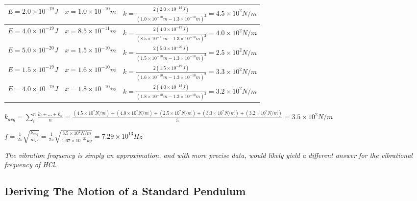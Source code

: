 \documentclass{article}
\begin{document}
\begin{center}
\begin{tabularx}{1\textwidth} { 
		| >{\raggedright\arraybackslash}X 
		| >{\centering\arraybackslash}X 
		| >{\raggedleft\arraybackslash}X | }
	\hline
	$E=2.0\times10^{-19}J$ & $x=1.0\times10^{-10}m$ & $k = \frac{2(2.0\times10^{-19}J)}{(1.0\times10^{-10}m - 1.3\times10^{-10}m)^2}=4.5\times10^{2}N/m $ \\
	\hline
	$E = 4.0\times10^{-19}J$  & $x = 8.5\times10^{-11}m $  & $k = \frac{2(4.0\times10^{-19}J)}{(8.5\times10^{-11}m - 1.3\times10^{-10}m)^2}=4.0\times10^{2}N/m $\\
	\hline
	$E = 5.0\times10^{-20}J$ & $x = 1.5\times10^{-10}m$ & $k = \frac{2(5.0\times10^{-20}J)}{(1.5\times10^{-10}m - 1.3\times10^{-10}m)^2}=2.5\times10^{2}N/m $ \\
	\hline
	$E = 1.5\times10^{-19}J$ & $x=1.6\times10^{-10}m$  & $k = \frac{2(1.5\times10^{-19}J)}{(1.6\times10^{-10}m - 1.3\times10^{-10}m)^2}=3.3\times10^{2}N/m $  \\
	\hline
	$E = 4.0\times10^{-19}J$  & $x = 1.8\times10^{-10}m$  & $k = \frac{2(4.0\times10^{-19}J)}{(1.8\times10^{-10}m - 1.3\times10^{-10}m)^2}=3.2\times10^{2}N/m $  \\
	\hline
\end{tabularx}
\end{center}
\begin{center}
	$k_{avg} = \sum_{i}^{n} \frac{k_i + ... +k_n}{n} = \frac{(4.5\times10^2N/m) + (4.0\times10^2N/m) + (2.5\times10^2N/m) + (3.3\times10^2N/m) + (3.2\times10^2N/m)}{5} = 3.5\times10^2N/m
	$
\end{center}
\begin{center}
$\boxed{f = \frac{1}{2\pi}\sqrt{\frac{k_{avg}}{m_H}} = \frac{1}{2\pi}\sqrt{\frac{3.5\times10^2N/m}{1.67\times10^{-27}kg}} = 7.29\times10^{13}Hz}
$
\end{center}
\textit{The vibration frequency is simply an approximation, and with more precise data, would likely yield a different answer for the vibrational frequency of HCl.}

\subsection{Deriving The Motion of a Standard Pendulum}
\end{document}

